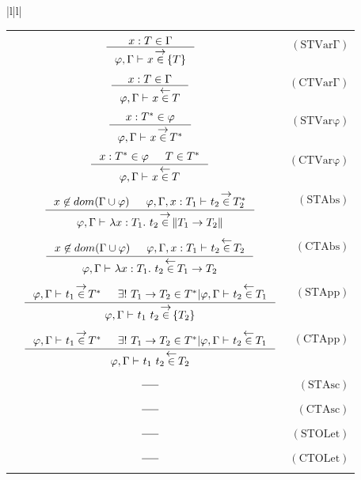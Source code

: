 \documentclass[preprint,authoryear,sort&compress,9pt,nocopyrightspace]{article}
\newcommand\rulename[1]{\mathrm{(#1)}}
\newcommand{\lto}{\leftarrow}
\newcommand{\env}{{\emt,\Gamma \vdash \ }}
\newcommand{\envE}{{\emt, \Gamma , x:T_1 \vdash \ }}
\newcommand{\appD}{t_1 \ t_2}
\newcommand{\absD}{\lambda x:T_1. \ t_2}
\newcommand{\mtD}{T^{*}}
\newcommand{\mtP}[1]{#1^{*}}
\newcommand{\mtCu}[1]{\{ #1 \}}
\newcommand{\emt}{\varphi}
\newcommand\inferir{\stackrel{\mathclap{\normalfont\mbox{$\to$}}}{\in}}
\newcommand\chequear{\stackrel{\mathclap{\normalfont\mbox{$\lto$}}}{\in}}
\providecommand{\norm}[1]{\lVert#1\rVert}
\begin{document}
\begin{figure}
\begin{small}
\begin{center}
\hspace*{-1.8cm}
\begin{tabular}{|l|l|}
\hline
\begin{tabular}{l c r}
&&\framebox {$\env t:T$}\\
&$\inference {x:T \in \Gamma}{\env x \inferir \mtCu{T}}$&$\rulename{STVar\Gamma}$\\
&&\\
&$\inference {x:T \in \Gamma}{\env x \chequear T}$&$\rulename{CTVar\Gamma}$\\
&&\\
&$\inference {x:\mtD \in \emt}{\env x \inferir \mtD}$&$\rulename{STVar\emt}$\\
&&\\
&$\inference {x:\mtD \in \emt & T \in \mtD}{\env x \chequear T}$&$\rulename{CTVar\emt}$\\
&&\\
&$\inference {x \not \in dom(\Gamma \cup \emt) & \envE t_2 \inferir\mtP{T_2}}{\env \absD \inferir \norm{T_1 \to T_2}}$&$\rulename{STAbs}$\\
&&\\
&$\inference {x \not \in dom(\Gamma \cup \emt) & \envE t_2 \chequear T_2}{\env \absD \chequear T_1 \to T_2}$&$\rulename{CTAbs}$\\
&&\\
&$\inference {\env t_1 \inferir \mtP{T} &  \exists! \ T_{1}\to T_{2} \in \mtP{T}| \env t_2 \chequear T_{1}}{\env \appD \inferir \mtCu{T_{2}}}$&$\rulename{STApp}$\\
&&\\
&$\inference {\env t_1 \inferir \mtP{T} &  \exists! \ T_{1}\to T_{2} \in \mtP{T}| \env t_2 \chequear T_{1}}{\env \appD \chequear T_{2}}$&$\rulename{CTApp}$\\
&&\\
&$\inference{}{}$&$\rulename{STAsc}$\\
&&\\
&$\inference{}{}$&$\rulename{CTAsc}$\\
&&\\
&$\inference{}{}$&$\rulename{STOLet}$\\
&&\\
&$\inference{}{}$&$\rulename{CTOLet}$\\
&&\\

\end{tabular}
\end{tabular}
\end{center}
\end{small}
\end{figure}
\end{document}
